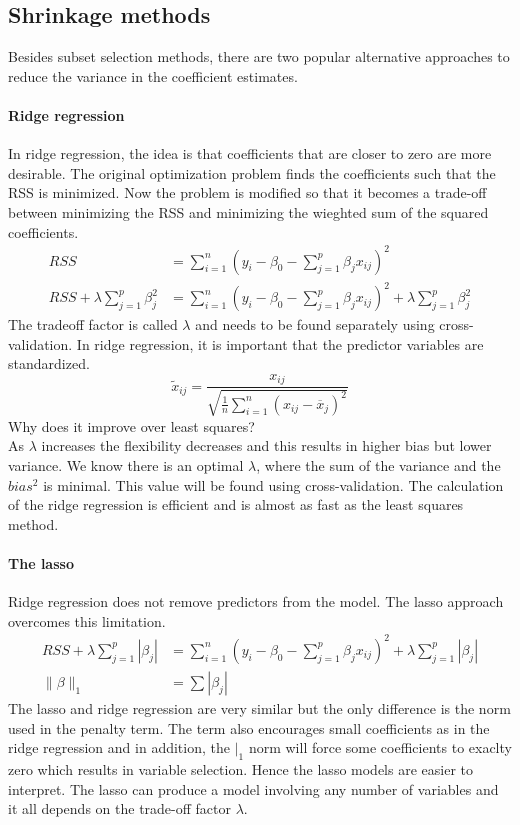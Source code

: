 \documentclass[../document.tex]{subfiles}
\begin{document}
	\subsection{Shrinkage methods}
	Besides subset selection methods, there are two popular alternative approaches to reduce the variance in the coefficient estimates.
	\paragraph{Ridge regression}
	In ridge regression, the idea is that coefficients that are closer to zero are more desirable. The original optimization problem finds the coefficients such that the RSS is minimized. Now the problem is modified so that it becomes a trade-off between minimizing the RSS and minimizing the wieghted sum of the squared coefficients.
	\begin{equation}
	\begin{split}
		RSS &= \sum_{i=1}^{n}(y_{i}-\beta_{0}-\sum_{j=1}^{p}\beta_{j}x_{ij})^2\\
		RSS+\lambda\sum_{j=1}^{p}\beta_{j}^2 &= \sum_{i=1}^{n}(y_{i}-\beta_{0}-\sum_{j=1}^{p}\beta_{j}x_{ij})^2+\lambda\sum_{j=1}^{p}\beta_{j}^2
	\end{split}
	\end{equation}
	The tradeoff factor is called \(\lambda\) and needs to be found separately using cross-validation. In ridge regression, it is important that the predictor variables are standardized.
	\begin{equation}
		\tilde{x}_{ij}=\frac{x_{ij}}{\sqrt{\frac{1}{n}\sum_{i=1}^{n}(x_{ij}-\overline{x}_{j})^2}}
	\end{equation} 
	Why does it improve over least squares?\\
	As \(\lambda\) increases the flexibility decreases and this results in higher bias but lower variance. We know there is an optimal \(\lambda\), where the sum of the variance and the \(bias^2\) is minimal. This value will be found using cross-validation. The calculation of the ridge regression is efficient and is almost as fast as the least squares method.
	\paragraph{The lasso}
	Ridge regression does not remove predictors from the model. The lasso approach overcomes this limitation. 
	\begin{equation}
	\begin{split}
		RSS+\lambda\sum_{j=1}^{p}|\beta_{j}| &= \sum_{i=1}^{n}(y_{i}-\beta_{0}-\sum_{j=1}^{p}\beta_{j}x_{ij})^2+\lambda\sum_{j=1}^{p}|\beta_{j}|\\
		\|\beta\|_{1}&=\sum|\beta_{j}|
	\end{split}
	\end{equation}
	The lasso and ridge regression are very similar but the only difference is the norm used in the penalty term. The term also encourages small coefficients as in the ridge regression and in addition, the \(|_{1}\) norm will force some coefficients to exaclty zero which results in variable selection. Hence the lasso models are easier to interpret. The lasso can produce a model involving any number of variables and it all depends on the trade-off factor \(\lambda\).
\end{document}
